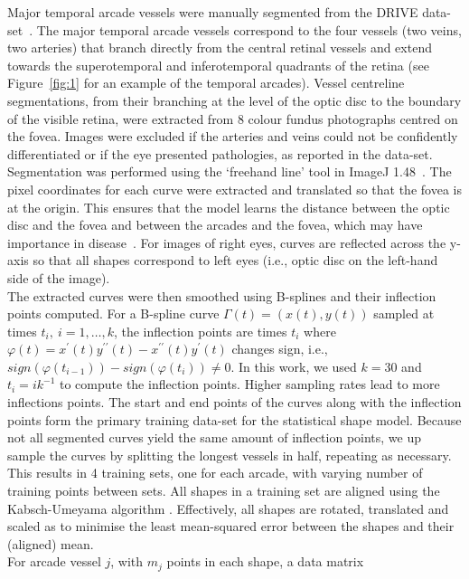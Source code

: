 \documentclass[11pt,]{article}
\begin{document}
Major temporal arcade vessels were manually segmented from the DRIVE data-set~\cite{Staal_2004}.
The major temporal arcade vessels correspond to the four
vessels (two veins, two arteries) that branch directly from the
central retinal vessels and extend towards the superotemporal and inferotemporal quadrants of 
the retina (see Figure~\ref{fig:1} for an example of the temporal
arcades).  Vessel centreline segmentations, from their branching at
the level of the optic disc to the boundary of the visible retina,
were extracted from 8 colour fundus photographs centred on the fovea.
Images were excluded if the arteries and veins could not be
confidently differentiated or if the eye presented pathologies, as
reported in the data-set.  Segmentation was performed using the
`freehand line' tool in ImageJ 1.48~\cite{Schneider2012}.  The pixel
coordinates for each curve were extracted and translated so that the
fovea is at the origin.  This ensures that the model learns the
distance between the optic disc and the fovea and between the arcades
and the fovea, which may have importance in disease~\cite{Arslan2021}.
For images of right eyes, curves are reflected across the y-axis so that all shapes correspond to left eyes
(i.e., optic disc on the left-hand side of the image).
\\
The extracted curves were then smoothed using B-splines and their
inflection points computed. For a B-spline curve
$\Gamma(t)=\left(x(t),y(t)\right)$ sampled at times $t_i,\ i=1,…,k$,
the inflection points are times $t_i$ where
$\varphi(t)=x^\prime(t)y^{\prime\prime}(t)-x^{\prime\prime}(t)y^\prime(t)$
changes sign, i.e.,
$sign(\varphi(t_{i-1}))-sign(\varphi(t_i))\neq0$. In this work, we
used $k=30$ and $t_i=i k^{-1}$ to compute the inflection
points. Higher sampling rates lead to more inflections points. The
start and end points of the curves along with the inflection points
form the primary training data-set for the statistical shape
model. Because not all segmented curves yield the same amount of
inflection points, we up sample the curves by splitting the longest
vessels in half, repeating as necessary. This results in 4 training
sets, one for each arcade, with varying number of training points
between sets. All shapes in a training set are aligned using the
Kabsch-Umeyama algorithm \cite{Umeyama1991}. Effectively, all shapes are
rotated, translated and scaled as to minimise the least mean-squared
error between the shapes and their (aligned) mean.
\\
For arcade vessel $j$, with $m_j$ points in each shape, a data matrix
\end{document}
